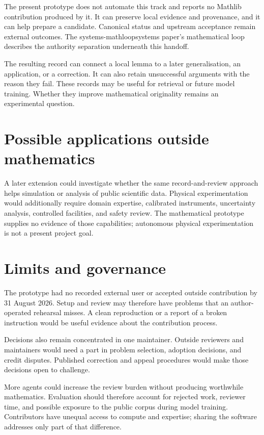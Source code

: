 \documentclass[10pt]{article}
\begin{document}
The present prototype does not automate this track and reports no Mathlib
contribution produced by it.  It can preserve local evidence and provenance,
and it can help prepare a candidate.  Canonical status and upstream acceptance
remain external outcomes.  The
%
{systems-mathloop}{systems paper's mathematical loop} describes the authority
separation underneath this handoff.

The resulting record can connect a local lemma to a later generalisation, an
application, or a correction. It can also retain unsuccessful arguments with
the reason they fail. These records may be useful for retrieval or future
model training. Whether they improve mathematical originality remains an
experimental question.

\section{Possible applications outside mathematics}\label{sec:science}

A later extension could investigate whether the same record-and-review
approach helps simulation or analysis of public scientific data. Physical
experimentation would additionally require domain expertise, calibrated
instruments, uncertainty analysis, controlled facilities, and safety review.
The mathematical prototype supplies no evidence of those capabilities;
autonomous physical experimentation is not a present project goal.

\section{Limits and governance}\label{sec:limits}

The prototype had no recorded external user or accepted outside contribution
by 31 August 2026. Setup and review may therefore have problems that an
author-operated rehearsal misses. A clean reproduction or a report of a broken
instruction would be useful evidence about the contribution process.

Decisions also remain concentrated in one maintainer. Outside reviewers and
maintainers would need a part in problem selection, adoption decisions, and
credit disputes. Published correction and appeal procedures would make those
decisions open to challenge.

More agents could increase the review burden without producing worthwhile
mathematics. Evaluation should therefore account for rejected work, reviewer
time, and possible exposure to the public corpus during model training.
Contributors have unequal access to compute and expertise; sharing the
software addresses only part of that difference.
\end{document}
